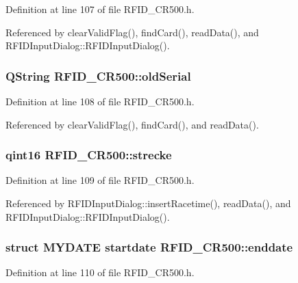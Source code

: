 Definition at line 107 of file RFID\_\-CR500.h.

Referenced by clearValidFlag(), findCard(), readData(), and RFIDInputDialog::RFIDInputDialog().\hypertarget{class_r_f_i_d___c_r500_92b6e6199e3e40cdeddceafe64707af9}{
\subsubsection[oldSerial]{\setlength{\rightskip}{0pt plus 5cm}QString {\bf RFID\_\-CR500::oldSerial}}}
\label{class_r_f_i_d___c_r500_92b6e6199e3e40cdeddceafe64707af9}




Definition at line 108 of file RFID\_\-CR500.h.

Referenced by clearValidFlag(), findCard(), and readData().\hypertarget{class_r_f_i_d___c_r500_2fa7bc6f3433a1acf060356166d591a6}{
\subsubsection[strecke]{\setlength{\rightskip}{0pt plus 5cm}qint16 {\bf RFID\_\-CR500::strecke}}}
\label{class_r_f_i_d___c_r500_2fa7bc6f3433a1acf060356166d591a6}




Definition at line 109 of file RFID\_\-CR500.h.

Referenced by RFIDInputDialog::insertRacetime(), readData(), and RFIDInputDialog::RFIDInputDialog().\hypertarget{class_r_f_i_d___c_r500_a833f1ef40098bd9f9d07787bfe45271}{
\subsubsection[enddate]{\setlength{\rightskip}{0pt plus 5cm}struct {\bf MYDATE} startdate {\bf RFID\_\-CR500::enddate}}}
\label{class_r_f_i_d___c_r500_a833f1ef40098bd9f9d07787bfe45271}




Definition at line 110 of file RFID\_\-CR500.h.

